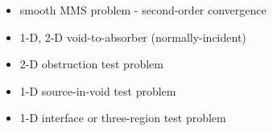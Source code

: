 \begin{itemize}
  \item smooth MMS problem - second-order convergence
  \item 1-D, 2-D void-to-absorber (normally-incident)
  \item 2-D obstruction test problem
  \item 1-D source-in-void test problem
  \item 1-D interface or three-region test problem
\end{itemize}
